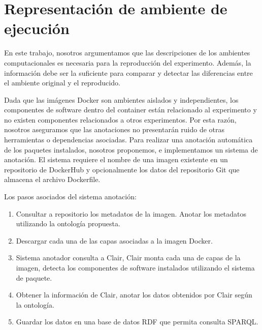 
\chapter{Representación de ambiente de ejecución} %


En este trabajo, nosotros argumentamos que las descripciones de los ambientes computacionales es necesaria para la reproducción  del experimento. Además, la información debe ser la suficiente para comparar y detectar las diferencias entre el ambiente original y el reproducido.

Dada que las imágenes Docker son ambientes aislados y independientes, los componentes de software dentro del container están relacionado al experimento y no existen componentes relacionados a otros experimentos.
Por esta razón, nosotros aseguramos que las anotaciones no presentarán ruido de otras herramientas o dependencias asociadas.
Para realizar una anotación automática de los paquetes instalados, nosotros proponemos, e implementamos un sistema de anotación.
El sistema requiere el nombre de una imagen existente en un repositorio de DockerHub y opcionalmente los datos del repositorio Git que almacena el archivo Dockerfile. 

Los pasos asociados del sistema anotación:

\begin{enumerate}
	\item Consultar a repositorio los metadatos de la imagen. Anotar los metadatos utilizando la ontología propuesta.
	\item Descargar cada una de las capas asociadas a la imagen Docker.
	\item Sistema anotador consulta a Clair, Clair monta cada una de capas de la imagen, detecta los componentes de software instalados utilizando el sistema de paquete.
	\item Obtener la información de Clair, anotar los datos obtenidos por Clair según la ontología.
	\item Guardar los datos en una base de datos RDF que permita consulta SPARQL.
\end{enumerate} 

